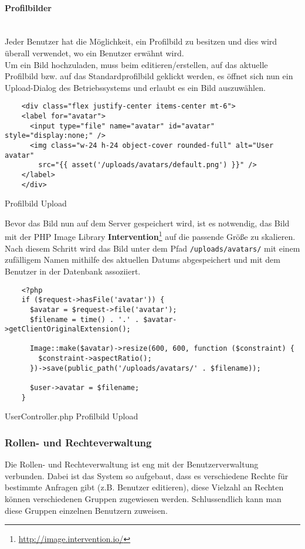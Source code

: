 \paragraph{Profilbilder}\mbox{}\\
Jeder Benutzer hat die Möglichkeit, ein Profilbild zu besitzen und dies wird
überall verwendet, wo ein Benutzer erwähnt wird.\\

Um ein Bild hochzuladen, muss beim editieren/erstellen, auf das aktuelle Profilbild bzw.
auf das Standardprofilbild geklickt werden, es öffnet sich nun ein Upload-Dialog
des Betriebssystems und erlaubt es ein Bild auszuwählen.

\begin{listing}[H]
  \begin{verbatim}
    <div class="flex justify-center items-center mt-6">
    <label for="avatar">
      <input type="file" name="avatar" id="avatar" style="display:none;" />
      <img class="w-24 h-24 object-cover rounded-full" alt="User avatar"
        src="{{ asset('/uploads/avatars/default.png') }}" />
    </label>
    </div>
  \end{verbatim}
  \caption{Profilbild Upload}
\end{listing}

Bevor das Bild nun auf dem Server gespeichert wird, ist es notwendig, das Bild
mit der 
PHP Image Library
\textbf{Intervention}\footnote{\url{http://image.intervention.io/}} auf
die passende Größe zu skalieren. Nach diesem Schritt wird das Bild unter dem
Pfad \verb|/uploads/avatars/| mit einem zufälligem Namen mithilfe des aktuellen Datums abgespeichert und mit
dem Benutzer in der Datenbank assoziiert.

\begin{listing}[H]
  \begin{verbatim}
    <?php
    if ($request->hasFile('avatar')) {
      $avatar = $request->file('avatar');
      $filename = time() . '.' . $avatar->getClientOriginalExtension();

      Image::make($avatar)->resize(600, 600, function ($constraint) {
        $constraint->aspectRatio();
      })->save(public_path('/uploads/avatars/' . $filename));

      $user->avatar = $filename;
    }
  \end{verbatim}
  \caption{UserController.php Profilbild Upload}
\end{listing}

\subsubsection{Rollen- und Rechteverwaltung}
Die Rollen- und Rechteverwaltung ist eng mit der Benutzerverwaltung verbunden.
Dabei ist das System so aufgebaut, dass es verschiedene Rechte für bestimmte
Anfragen gibt (z.B. Benutzer editieren), diese Vielzahl an Rechten können
verschiedenen Gruppen zugewiesen werden. Schlussendlich kann man diese Gruppen
einzelnen Benutzern zuweisen.\\

